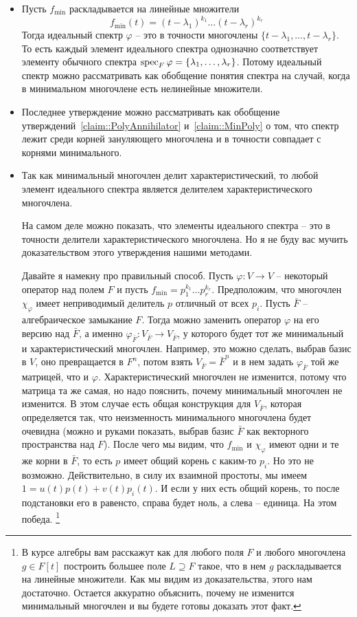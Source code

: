 \begin{itemize}
\item Пусть $f_{\text{min}}$ раскладывается на линейные множители
\[
f_{\text{min}}(t) = (t - \lambda_1)^{k_1}\ldots(t-\lambda_r)^{k_r}
\]
Тогда идеальный спектр $\varphi$ -- это в точности многочлены $\{t-\lambda_1,\ldots,t-\lambda_r\}$.
То есть каждый элемент идеального спектра однозначно соответствует элементу обычного спектра $\operatorname{spec}_F\varphi = \{\lambda_1,\ldots,\lambda_r\}$.
Потому идеальный спектр можно рассматривать как обобщение понятия спектра на случай, когда в минимальном многочлене есть нелинейные множители.

\item Последнее утверждение можно рассматривать как обобщение утверждений~\ref{claim::PolyAnnihilator} и~\ref{claim::MinPoly} о том, что спектр лежит среди корней зануляющего многочлена и в точности совпадает с корнями минимального.

\item Так как минимальный многочлен делит характеристический, то любой элемент идеального спектра является делителем характеристического многочлена.

На самом деле можно показать, что элементы идеального спектра -- это в точности делители характеристического многочлена.
Но я не буду вас мучить доказательством этого утверждения нашими методами.

Давайте я намекну про правильный способ.
Пусть $\varphi\colon V\to V$ -- некоторый оператор над полем $F$ и пусть $f_\text{min} = p_1^{k_1}\ldots p_r^{k_r}$.
Предположим, что многочлен $\chi_\varphi$ имеет неприводимый делитель $p$ отличный от всех $p_i$.
Пусть $\bar F$ -- алгебраическое замыкание $F$.
Тогда можно заменить оператор $\varphi$ на его версию над $\bar F$, а именно $\varphi_{\bar F}\colon V_{\bar F}\to V_{\bar F}$, у которого будет тот же минимальный и характеристический многочлен.
Например, это можно сделать, выбрав базис в $V$, оно превращается в $F^n$, потом взять $V_{\bar F} = \bar F^n$ и в нем задать $\varphi_{\bar F}$ той же матрицей, что и $\varphi$.
Характеристический многочлен не изменится, потому что матрица та же самая, но надо пояснить, почему минимальный многочлен не изменится.
В этом случае есть общая конструкция для $V_{\bar F}$, которая определяется так, что неизменность минимального многочлена будет очевидна (можно и руками показать, выбрав базис $\bar F$ как векторного пространства над $F$).
После чего мы видим, что $f_\text{min}$ и $\chi_\varphi$ имеют одни и те же корни в $\bar F$, то есть $p$ имеет общий корень с каким-то $p_i$.
Но это не возможно.
Действительно, в силу их взаимной простоты, мы имеем $1 = u(t) p(t) + v(t) p_i(t)$.
И если у них есть общий корень, то после подстановки его в равенсто, справа будет ноль, а слева -- единица.
На этом победа.%
\footnote{В курсе алгебры вам расскажут как для любого поля $F$ и любого многочлена $g\in F[t]$ построить большее поле $L\supseteq F$ такое, что в нем $g$ раскладывается на линейные множители.
Как мы видим из доказательства, этого нам достаточно.
Остается аккуратно объяснить, почему не изменится минимальный многочлен и вы будете готовы доказать этот факт.}
\end{itemize}

